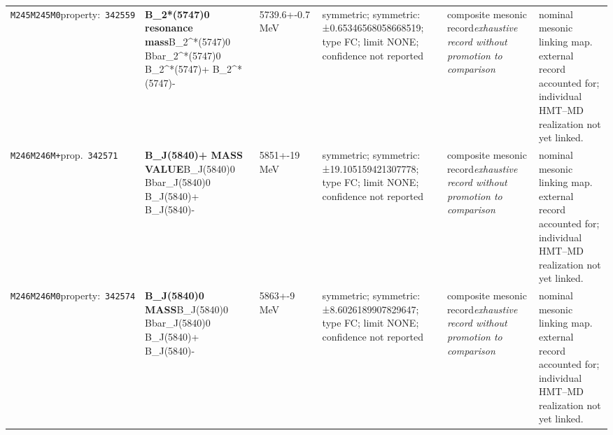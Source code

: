 \begin{landscape}
\begin{longtable}{L{1.85cm}L{4.45cm}L{2.35cm}L{4.05cm}L{3.35cm}L{7.15cm}}
\texttt{M245}\newline \texttt{M245M0}\newline property:\ \texttt{342559} & \textbf{B\_\allowbreak{}2*(5747)0 resonance mass}\newline B\_\allowbreak{}2\textasciicircum{}*(5747)0 \textbar{}\allowbreak{} Bbar\_\allowbreak{}2\textasciicircum{}*(5747)0 \textbar{}\allowbreak{} B\_\allowbreak{}2\textasciicircum{}*(5747)+ \textbar{}\allowbreak{} B\_\allowbreak{}2\textasciicircum{}*(5747)- & 5739.6+-0.7\,MeV & symmetric; symmetric: ±0.65346568058668519; type FC; limit NONE; confidence not reported & composite mesonic record\newline \emph{exhaustive record without promotion to comparison} & nominal mesonic linking map. external record accounted for; individual HMT--MD realization not yet linked. \\
\texttt{M246}\newline \texttt{M246M+}\newline prop.\ \texttt{342571} & \textbf{B\_\allowbreak{}J(5840)+ MASS VALUE}\newline B\_\allowbreak{}J(5840)0 \textbar{}\allowbreak{} Bbar\_\allowbreak{}J(5840)0 \textbar{}\allowbreak{} B\_\allowbreak{}J(5840)+ \textbar{}\allowbreak{} B\_\allowbreak{}J(5840)- & 5851+-19\,MeV & symmetric; symmetric: ±19.105159421307778; type FC; limit NONE; confidence not reported & composite mesonic record\newline \emph{exhaustive record without promotion to comparison} & nominal mesonic linking map. external record accounted for; individual HMT--MD realization not yet linked. \\
\texttt{M246}\newline \texttt{M246M0}\newline property:\ \texttt{342574} & \textbf{B\_\allowbreak{}J(5840)0 MASS}\newline B\_\allowbreak{}J(5840)0 \textbar{}\allowbreak{} Bbar\_\allowbreak{}J(5840)0 \textbar{}\allowbreak{} B\_\allowbreak{}J(5840)+ \textbar{}\allowbreak{} B\_\allowbreak{}J(5840)- & 5863+-9\,MeV & symmetric; symmetric: ±8.6026189907829647; type FC; limit NONE; confidence not reported & composite mesonic record\newline \emph{exhaustive record without promotion to comparison} & nominal mesonic linking map. external record accounted for; individual HMT--MD realization not yet linked. \\

\end{longtable}
\end{landscape}
